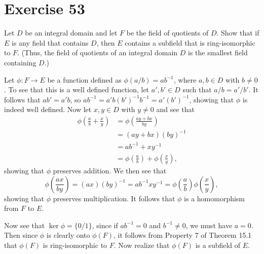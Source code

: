 \documentclass[12pt]{article}
\begin{document}
\section*{Exercise 53}

Let $D$ be an integral domain and let $F$ be the field of quotients of $D$.
Show that if $E$ is any field that contains $D$, then $E$ contains a subfield
that is ring-isomorphic to $F$.  (Thus, the field of quotients of an integral
domain $D$ is the smallest field containing $D$.)

Let $\phi:F\to E$ be a function defined as $\phi(a/b)=ab^{-1}$, where $a,b\in D$ with $b\neq 0$.
To see that this is a well defined function, let $a',b'\in D$ such that $a/b=a'/b'$.
It follows that $ab'=a'b$, so $ab^{-1}=a'b(b')^{-1}b^{-1}=a'(b')^{-1}$, showing
that $\phi$ is indeed well defined.  Now let $x,y\in D$ with $y\neq 0$ and
see that
\begin{align*}
\phi\left(\frac{a}{b}+\frac{x}{y}\right)&=\phi\left(\frac{ay+bx}{by}\right) \\
 &=(ay+bx)(by)^{-1} \\
 &= ab^{-1} + xy^{-1} \\
 &= \phi\left(\frac{a}{b}\right)+\phi\left(\frac{x}{y}\right),
\end{align*}
showing that $\phi$ preserves addition.  We then see that
\begin{equation*}
\phi\left(\frac{ax}{by}\right)=(ax)(by)^{-1}=ab^{-1}xy^{-1}=\phi\left(\frac{a}{b}\right)\phi\left(\frac{x}{y}\right),
\end{equation*}
showing that $\phi$ preserves multiplication.  It follows that $\phi$ is
a homomorphism from $F$ to $E$.

Now see that $\ker\phi=\{0/1\}$, since if $ab^{-1}=0$ and $b^{-1}\neq 0$, we must have $a=0$.
Then since $\phi$ is clearly onto $\phi(F)$, it follows from Property 7 of
Theorem 15.1 that $\phi(F)$ is ring-isomorphic to $F$.  Now realize that $\phi(F)$ is a
subfield of $E$.
\end{document}
